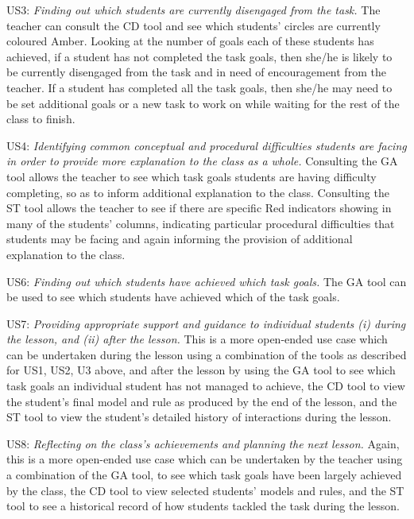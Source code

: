 US3: {\em Finding out which students are currently disengaged from the
  task.} The teacher can consult the CD tool and see which students’
circles are currently coloured Amber. Looking at the number of goals
each of these students has achieved, if a student has not completed
the task goals, then she/he is likely to be currently disengaged from
the task and in need of encouragement from the teacher. If a student
has completed all the task goals, then she/he may need to be set
additional goals or a new task to work on while waiting for the rest
of the class to finish.
 
US4: {\em Identifying common conceptual and procedural difficulties
  students are facing in order to provide more explanation to the
  class as a whole.} Consulting the GA tool allows the teacher to see
which task goals students are having difficulty completing, so as to
inform additional explanation to the class.  Consulting the ST tool
allows the teacher to see if there are specific Red indicators showing
in many of the students’ columns, indicating particular procedural
difficulties that students may be facing and again informing the
provision of additional explanation to the class.

US6: {\em Finding out which students have achieved which task goals.}
The GA tool can be used to see which students have achieved which of
the task goals.
 
US7: {\em Providing appropriate support and guidance to individual
  students (i) during the lesson, and (ii) after the lesson.} This is
a more open-ended use case which can be undertaken during the lesson
using a combination of the tools as described for US1, US2, U3 above,
and after the lesson by using the GA tool to see which task goals an
individual student has not managed to achieve, the CD tool to view the
student’s final model and rule as produced by the end of the lesson,
and the ST tool to view the student’s detailed history of interactions
during the lesson.
 
US8: {\em Reflecting on the class’s achievements and planning the next
  lesson.} Again, this is a more open-ended use case which can be
undertaken by the teacher using a combination of the GA tool, to see
which task goals have been largely achieved by the class, the CD tool
to view selected students’ models and rules, and the ST tool to see a
historical record of how students tackled the task during the lesson.

